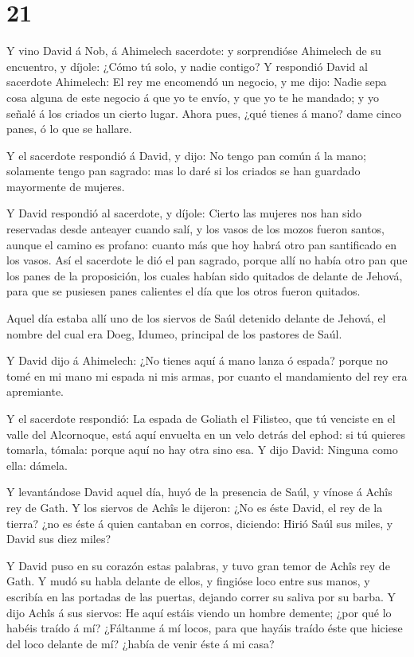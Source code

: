 \hypertarget{section-20}{%
\section{21}\label{section-20}}

 Y vino David á Nob, á Ahimelech sacerdote: y sorprendióse
Ahimelech de su encuentro, y díjole: ¿Cómo tú solo, y nadie contigo?
 Y respondió David al sacerdote Ahimelech: El rey me
encomendó un negocio, y me dijo: Nadie sepa cosa alguna de este negocio
á que yo te envío, y que yo te he mandado; y yo señalé á los criados un
cierto lugar.  Ahora pues, ¿qué tienes á mano? dame cinco
panes, ó lo que se hallare.

 Y el sacerdote respondió á David, y dijo: No tengo pan
común á la mano; solamente tengo pan sagrado: mas lo daré si los criados
se han guardado mayormente de mujeres.

 Y David respondió al sacerdote, y díjole: Cierto las
mujeres nos han sido reservadas desde anteayer cuando salí, y los vasos
de los mozos fueron santos, aunque el camino es profano: cuanto más que
hoy habrá otro pan santificado en los vasos.  Así el
sacerdote le dió el pan sagrado, porque allí no había otro pan que los
panes de la proposición, los cuales habían sido quitados de delante de
Jehová, para que se pusiesen panes calientes el día que los otros fueron
quitados.

 Aquel día estaba allí uno de los siervos de Saúl detenido
delante de Jehová, el nombre del cual era Doeg, Idumeo, principal de los
pastores de Saúl.

 Y David dijo á Ahimelech: ¿No tienes aquí á mano lanza ó
espada? porque no tomé en mi mano mi espada ni mis armas, por cuanto el
mandamiento del rey era apremiante.

 Y el sacerdote respondió: La espada de Goliath el Filisteo,
que tú venciste en el valle del Alcornoque, está aquí envuelta en un
velo detrás del ephod: si tú quieres tomarla, tómala: porque aquí no hay
otra sino esa. Y dijo David: Ninguna como ella: dámela.

 Y levantándose David aquel día, huyó de la presencia de
Saúl, y vínose á Achîs rey de Gath.  Y los siervos de Achîs
le dijeron: ¿No es éste David, el rey de la tierra? ¿no es éste á quien
cantaban en corros, diciendo: Hirió Saúl sus miles, y David sus diez
miles?

 Y David puso en su corazón estas palabras, y tuvo gran
temor de Achîs rey de Gath.  Y mudó su habla delante de
ellos, y fingióse loco entre sus manos, y escribía en las portadas de
las puertas, dejando correr su saliva por su barba.  Y dijo
Achîs á sus siervos: He aquí estáis viendo un hombre demente; ¿por qué
lo habéis traído á mí?  ¿Fáltanme á mí locos, para que
hayáis traído éste que hiciese del loco delante de mí? ¿había de venir
éste á mi casa?

